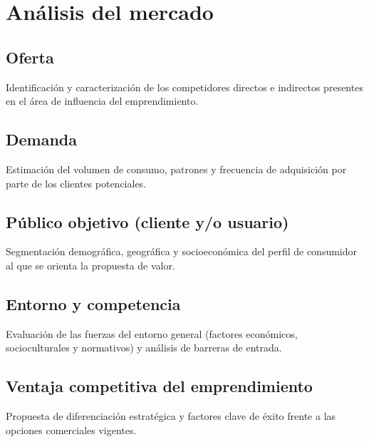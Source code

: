 \section{Análisis del mercado}
\label{sec:analisis_mercado}

\subsection{Oferta}
Identificación y caracterización de los competidores directos e indirectos presentes en el área de influencia del emprendimiento.

\subsection{Demanda}
Estimación del volumen de consumo, patrones y frecuencia de adquisición por parte de los clientes potenciales.

\subsection{Público objetivo (cliente y/o usuario)}
Segmentación demográfica, geográfica y socioeconómica del perfil de consumidor al que se orienta la propuesta de valor.

\subsection{Entorno y competencia}
Evaluación de las fuerzas del entorno general (factores económicos, socioculturales y normativos) y análisis de barreras de entrada.

\subsection{Ventaja competitiva del emprendimiento}
Propuesta de diferenciación estratégica y factores clave de éxito frente a las opciones comerciales vigentes.


